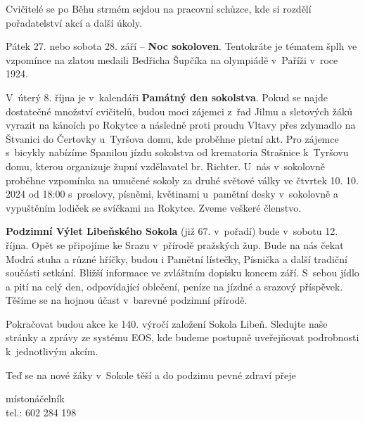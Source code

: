 \documentclass[11pt]{article}
\begin{document}
Cvičitelé se po Běhu strmém sejdou na pracovní schůzce, kde si rozdělí pořadatelství akcí a další úkoly.

Pátek 27. nebo sobota 28. září – \textbf{Noc sokoloven}. Tentokráte je tématem šplh ve vzpomínce na zlatou medaili Bedřicha Šupčíka na olympiádě v~Paříži v~roce 1924.

V~úterý 8. října je v~kalendáři \textbf{Památný den sokolstva}. Pokud se najde dostatečné množství cvičitelů, budou moci zájemci z~řad Jilmu a sletových žáků vyrazit na kánoích po Rokytce a následně proti proudu Vltavy přes zdymadlo na Štvanici do Čertovky u~Tyršova domu, kde proběhne pietní akt. Pro zájemce s~bicykly nabízíme Spanilou jízdu sokolstva od krematoria Strašnice k~Tyršovu domu, kterou organizuje župní vzdělavatel br. Richter. U~nás v~sokolovně proběhne vzpomínka na umučené sokoly za druhé světové války ve čtvrtek 10. 10. 2024 od 18:00 s~proslovy, písněmi, květinami u~pamětní desky v~sokolovně a vypuštěním lodiček se svíčkami na Rokytce. Zveme veškeré členstvo.

\textbf{Podzimní Výlet Libeňského Sokola} (již 67. v~pořadí) bude v~sobotu 12. října. Opět se připojíme ke Srazu v~přírodě pražských žup. Bude na nás čekat Modrá stuha a různé hříčky, budou i Pamětní lístečky, Písnička a další tradiční součásti setkání. Bližší informace ve zvláštním dopisku koncem září. S~sebou jídlo a pití na celý den, odpovídající oblečení, peníze na jízdné a srazový příspěvek. Těšíme se na hojnou účast v~barevné podzimní přírodě.

Pokračovat budou akce ke 140. výročí založení Sokola Libeň. Sledujte naše stránky a zprávy ze systému EOS, kde budeme postupně uveřejňovat podrobnosti k~jednotlivým akcím. 

Teď se na nové žáky v~Sokole těší a do podzimu pevné zdraví přeje

\signature{Jiří Novák (Jirkan)}{místonáčelník\\tel.: 602 284 198}


\clearpage
\end{document}
